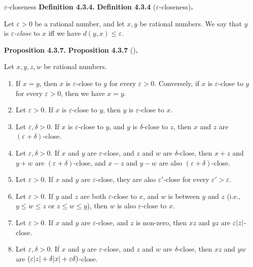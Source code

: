 \documentclass[12pt]{article}
\newenvironment{df}[2][\relax]{
\vspace{4mm}
    \noindent\setlength{\parskip}{1em}%
    \ifx#1\relax%
        \textbf{#2. }%
    \else%
        \textbf{#2} (#1)\textbf{. }%
    \fi%
    \ignorespaces%
}{}
\theoremstyle{remark}
\begin{document}
\begin{df}[$\varepsilon$-closeness]{Definition 4.3.4}
    Let $\varepsilon > 0$ be a rational number, and let $x, y$ be rational numbers.
    We say that $y$ is \emph{$\varepsilon$-close} to $x$ iff we have $d(y, x) \le \varepsilon$.    
\end{df}


\begin{df}{Proposition 4.3.7}
    Let $x, y, z, w$ be rational numbers.
    \begin{enumerate}[topsep=0mm,label=(\alph*)]
        \item If $x = y$, then $x$ is $\varepsilon$-close to $y$ for every $\varepsilon > 0$.
        Conversely, if $x$ is $\varepsilon$-close to $y$ for every $\varepsilon > 0$, then we have $x = y$.

        \item Let $\varepsilon > 0$. If $x$ is $\varepsilon$-close to $y$, then $y$ is $\varepsilon$-close to $x$.

        \item Let $\varepsilon, \delta > 0$. If $x$ is $\varepsilon$-close to $y$, and $y$ is $\delta$-close to $z$, then $x$ and $z$ are $(\varepsilon + \delta)$-close.

        \item Let $\varepsilon, \delta > 0$. If $x$ and $y$ are $\varepsilon$-close, and $z$ and $w$ are $\delta$-close, then $x + z$ and $y + w$ are $(\varepsilon + \delta)$-close, and $x - z$ and $y - w$ are also $(\varepsilon + \delta)$-close.

        \item Let $\varepsilon > 0$. If $x$ and $y$ are $\varepsilon$-close, they are also $\varepsilon'$-close for every $\varepsilon' > \varepsilon$.

        \item Let $\varepsilon > 0$. If $y$ and $z$ are both $\varepsilon$-close to $x$, and $w$ is between $y$ and $z$ (i.e., $y \le w \le z$ or $z \le w \le y$), then $w$ is also $\varepsilon$-close to $x$.
        
        \item Let $\varepsilon > 0$. If $x$ and $y$ are $\varepsilon$-close, and $z$ is non-zero, then $xz$ and $yz$ are $\varepsilon\abs{z}$-close.

        \item Let $\varepsilon, \delta > 0$. If $x$ and $y$ are $\varepsilon$-close, and $z$ and $w$ are $\delta$-close, then $xz$ and $yw$ are $(\varepsilon\abs{z} + \delta\abs{x} + \varepsilon\delta)$-close.
    \end{enumerate}
\end{df}
\end{document}
